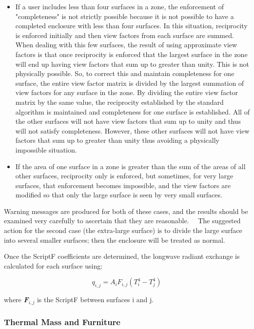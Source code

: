 \begin{itemize}
\item
  If a user includes less than four surfaces in a zone, the enforcement of "completeness" is not strictly possible because it is not possible to have a completed enclosure with less than four surfaces.  In this situation, reciprocity is enforced initially and then view factors from each surface are summed.  When dealing with this few surfaces, the result of using approximate view factors is that once reciprocity is enforced that the largest surface in the zone will end up having view factors that sum up to greater than unity.  This is not physically possible.  So, to correct this and maintain completeness for one surface, the entire view factor matrix is divided by the largest summation of view factors for any surface in the zone.  By dividing the entire view factor matrix by the same value, the reciprocity established by the standard algorithm is maintained and completeness for one surface is established.  All of the other surfaces will not have view factors that sum up to unity and thus will not satisfy completeness.  However, these other surfaces will not have view factors that sum up to greater than unity thus avoiding a physically impossible situation.
\item
  If the area of one surface in a zone is greater than the sum of the areas of all other surfaces, reciprocity only is enforced, but sometimes, for very large surfaces, that enforcement becomes impossible, and the view factors are modified so that only the large surface is seen by very small surfaces.
\end{itemize}

Warning messages are produced for both of these cases, and the results should be examined very carefully to ascertain that they are reasonable.~~ The suggested action for the second case (the extra-large surface) is to divide the large surface into several smaller surfaces; then the enclosure will be treated as normal.

Once the ScriptF coefficients are determined, the longwave radiant exchange is calculated for each surface using:

\begin{equation}
{q_{i,j}} = {A_i}{F_{i,j}}\left( {T_i^4 - T_j^4} \right)
\end{equation}

where \textbf{\emph{F}}\(_{i,j}\) is the ScriptF between surfaces i and j.

\subsubsection{Thermal Mass and Furniture}\label{thermal-mass-and-furniture}

